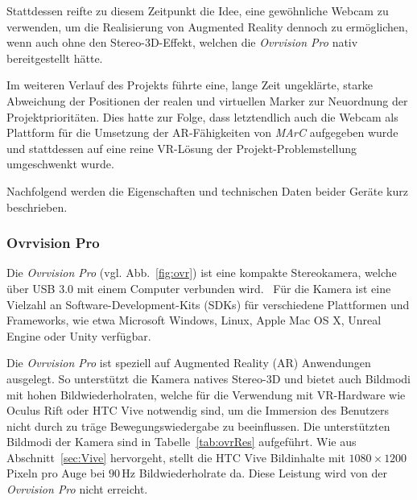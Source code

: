 Stattdessen reifte zu diesem Zeitpunkt die Idee, eine gewöhnliche Webcam zu verwenden, um die Realisierung von Augmented Reality dennoch zu ermöglichen, wenn auch ohne den Stereo-3D-Effekt, welchen die \emph{Ovrvision Pro} nativ bereitgestellt hätte.

Im weiteren Verlauf des Projekts führte eine, lange Zeit ungeklärte, starke Abweichung der Positionen der realen und virtuellen Marker zur Neuordnung der Projektprioritäten. Dies hatte zur Folge, dass letztendlich auch die Webcam als Plattform für die Umsetzung der AR-Fähigkeiten von \emph{MArC} aufgegeben wurde und stattdessen auf eine reine VR-Lösung der Projekt-Problemstellung umgeschwenkt wurde.

Nachfolgend werden die Eigenschaften und technischen Daten beider Geräte kurz beschrieben.
\subsubsection{Ovrvision Pro}\label{sec:ovrvision}
Die \emph{Ovrvision Pro} (vgl. Abb.~\ref{fig:ovr}) ist eine kompakte Stereokamera, welche über USB 3.0 mit einem Computer verbunden wird.~\cite{website:ovrvision} Für die Kamera ist eine Vielzahl an Software-Development-Kits (SDKs) für verschiedene Plattformen und Frameworks, wie etwa Microsoft Windows, Linux, Apple Mac OS X, Unreal Engine oder Unity verfügbar.~\cite{website:ovrvisionSetup}

Die \emph{Ovrvision Pro} ist speziell auf Augmented Reality (AR) Anwendungen ausgelegt. So unterstützt die Kamera natives Stereo-3D und bietet auch Bildmodi mit hohen Bildwiederholraten, welche für die Verwendung mit VR-Hardware wie Oculus Rift oder HTC Vive notwendig sind, um die Immersion des Benutzers nicht durch zu träge Bewegungswiedergabe zu beeinflussen. Die unterstützten Bildmodi der Kamera sind in Tabelle~\ref{tab:ovrRes} aufgeführt. Wie aus Abschnitt~\ref{sec:Vive} hervorgeht, stellt die HTC Vive Bildinhalte mit $1080\times1200$\,Pixeln pro Auge bei $90$\,Hz Bildwiederholrate da. Diese Leistung wird von der \emph{Ovrvision Pro} nicht erreicht.

